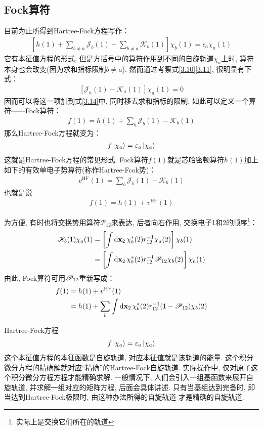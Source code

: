 \subsection{Fock算符}
目前为止所得到Hartree-Fock方程写作：
\begin{align}
	\label{3.14}
	\left[ h(1) + \sum_{b\neq a}\mathscr{J}_b(1) - \sum_{b\neq a}\mathscr{K}_b(1)   \right]\chi_b(1) = \epsilon_a\chi_a(1)
\end{align}
它有本征值方程的形式, 
但是方括号中的算符作用到不同的自旋轨道$\chi_a$上时, 
算符本身也会改变(因为求和指标限制$b\neq a$). 
然而通过考察式\eqref{3.10}\eqref{3.11}, 
很明显有下式：
\begin{align}
	\left[ \mathscr{J}_a(1) - \mathscr{K}_a(1)  \right]\chi_a(1) = 0
\end{align}
因而可以将这一项加到式\eqref{3.14}中, 
同时移去求和指标的限制, 
如此可以定义一个算符——Fock算符：
\begin{align}
	\label{3.16}
	f(1) = h(1) + \sum_{b}\mathscr{J}_b(1) - \mathscr{K}_b(1)
\end{align}
那么Hartree-Fock方程就变为：
\begin{align}
	\label{3.17}
	f\Ket{\chi_a} = \varepsilon_a\Ket{\chi_a}
\end{align}
这就是Hartree-Fock方程的常见形式. 
Fock算符$f(1)$就是芯哈密顿算符$h(1)$加上如下的有效单电子势算符(称作Hartree-Fcok势)：
\begin{align}
	\label{3.18}
	v^\mathrm{HF}(1) = \sum_b\mathscr{J}_b(1) - \mathscr{K}_b(1)
\end{align}
也就是说
\begin{align}
	f(1) = h(1) + v^\mathrm{HF}(1)
\end{align}

为方便, 有时也将交换势用算符$\mathscr{P}_{12}$来表达, 后者向右作用, 交换电子1和2的顺序\footnote{实际上是交换它们所在的轨道}：
\begin{align}
	\scr{K}_b(1)\chi_a(1) & = \left[ \int\dd{x}_2\,\chi_b^*(2)r_{12}^{-1}\chi_a(2) \right]\chi_b(1)\notag\\
	& = \left[ \int\dd{x}_2\,\chi_b^*(2)r_{12}^{-1}\scr{P}_{12}\chi_b(2) \right]\chi_a(1)
\end{align}
由此, 
Fock算符可用$\mathscr{P}_{12}$重新写成：
\begin{align}
	f(1) & = h(1) + v^\mathrm{HF}(1) \notag \\
	& = h(1) + \sum_b\int\dd{x}_2\,\chi_b^*(2)\twoe(1-\scr{P}_{12})\chi_b(2)
\end{align}

Hartree-Fock方程
\begin{align}
	f\Ket{\chi_a} = \varepsilon_a\Ket{\chi_a}
\end{align}
这个本征值方程的本征函数是自旋轨道, 
对应本征值就是该轨道的能量. 
这个积分微分方程的精确解就对应“精确”的Hartree-Fock自旋轨道. 
实际操作中, 
仅对原子这个积分微分方程方程才能精确求解. 
一般情况下, 
人们会引入一组基函数来展开自旋轨道, 
并求解一组对应的矩阵方程, 
后面会具体讲述. 
只有当基组达到完备时, 
即当达到Hartree-Fock极限时, 
由这种办法所得的自旋轨道 才是精确的\hft 自旋轨道.


